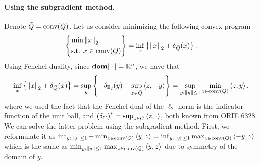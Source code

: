 \documentclass[10pt]{article}
\begin{document}
\begin{Answer}
    \paragraph{Using the subgradient method.}
    Denote $\bar{Q} = \mathrm{conv}(Q)$. Let us consider minimizing the following
    convex program
    \begin{align*}
        \left\{
        \begin{aligned}
        \min & \left \| x \right \|_2 \\
        \mbox{s.t. } & x \in \mathrm{conv}(Q)
        \end{aligned} \right\}
        = \inf_{x} \left\{ \left \| x \right \|_2 + \delta_{\bar{Q}}(x) \right\}.
    \end{align*}
    Using Fenchel duality, since $\textbf{dom}{\left \| \cdot \right \|} = \mathbb{R}^n$, we have that
    \[
        \inf_{x}\left\{ \left \| x \right \|_2 + \delta_{\bar{Q}}(x) \right\}
        = \sup_{y} \left\{ - \delta_{\mathbb{B}_2}(y)
        - \sup_{z \in \bar{Q}} \left\langle z, -y \right\rangle   \right\}
        = \sup_{y : \left \| y \right \| \leq 1} \min_{z \in \mathrm{conv}(Q)} \left\langle z, y \right\rangle,
    \]
    where we used the fact that the Fenchel dual of the $\ell_2$ norm is
    the indicator function of the unit ball, and $\left(\delta_{C}\right)^*
    = \sup_{z \in C} \left\langle z, \cdot \right\rangle$, both known from ORIE 6328.
    We can solve the latter problem using the subgradient method. First, we
    reformulate it as $\inf_{y : \left \| y \right \| \leq 1} - \min_{z \in \mathrm{conv}(Q)}
    \left\langle y, z \right\rangle = \inf_{y : \left \| y \right \| \leq 1} \max_{z \in \mathrm{conv}(Q)}
    \left\langle -y, z \right\rangle$ which is the same as
    $\min_{y : \left \| y \right \| \leq 1} \max_{z \in \mathrm{conv}(Q)} \left\langle y, z \right\rangle$ due to
    symmetry of the domain of $y$.


\end{Answer}
\end{document}
